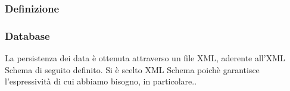 \subsubsection{Definizione}
	
\subsubsection{Database}
	La persistenza dei data \`e ottenuta attraverso un file XML, aderente all'XML Schema di seguito definito.
Si \`e scelto XML Schema poich\`e garantisce l'espressivit\`a di cui abbiamo bisogno, in particolare..